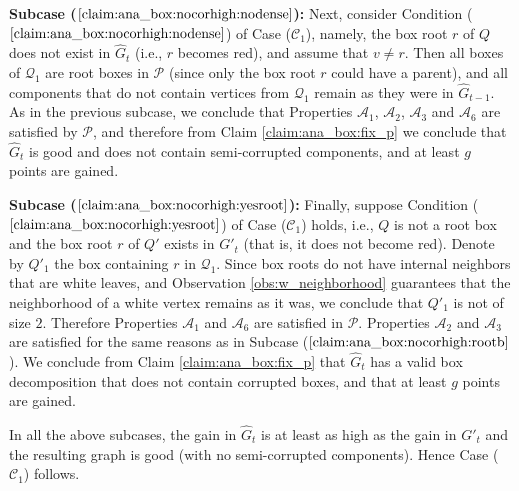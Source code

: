 \documentclass[11pt]{article}
\theoremstyle{definition}
\def\decomponereg{\mathcal{A}_1}
\def\decomponecorr{\mathcal{A}_2}
\def\decomproot{\mathcal{A}_3}
\def\decompedges{\mathcal{A}_6}
\def\boxpropnocorhigh{\mathcal{C}_1}
\begin{document}
\smallskip
\par\noindent
{\bf Subcase ($\ref{claim:ana_box:nocorhigh:nodense}$):}
	Next, consider Condition ($\ref{claim:ana_box:nocorhigh:nodense}$) of Case ($\boxpropnocorhigh$), namely,
	the box root $r$ of $Q$ does not exist in $\hat{G}_t$ (i.e., $r$ becomes red), and assume that $v \neq r$.
	Then all boxes of $\mathcal{Q}_1$ are root boxes in $\mathcal{P}$ (since only the box root $r$ could have a parent), and all components that do not contain vertices from $\mathcal{Q}_1$ remain as they were in $\hat{G}_{t-1}$.
	As in the previous subcase, 
	we conclude that Properties $\decomponereg$, $\decomponecorr$, $\decomproot$ and $\decompedges$ are satisfied by $\mathcal{P}$, and therefore from Claim
	\ref{claim:ana_box:fix_p} we conclude that $\hat{G}_t$ is good and does not contain semi-corrupted components, and at least $g$ points are gained.
	
\smallskip
\par\noindent
{\bf Subcase ($\ref{claim:ana_box:nocorhigh:yesroot}$):}
	Finally, suppose Condition ($\ref{claim:ana_box:nocorhigh:yesroot}$) of Case ($\boxpropnocorhigh$) holds, i.e.,
	$Q$ is not a root box and the box root $r$ of $Q'$ exists in $G'_t$ (that is, it does not become red). Denote by $Q'_1$ the box containing $r$ in $\mathcal{Q}_1$.
	Since box roots do not have internal neighbors that are white leaves, and Observation \ref{obs:w_neighborhood} guarantees that the neighborhood of a white vertex remains as it was, 
	we conclude that $Q'_1$ is not of size $2$.
	Therefore Properties $\decomponereg$ and $\decompedges$ are satisfied in $\mathcal{P}$. 
	Properties $\decomponecorr$ and $\decomproot$ are satisfied for the same reasons as in Subcase ($\ref{claim:ana_box:nocorhigh:rootb}$).
	We conclude from Claim \ref{claim:ana_box:fix_p} that $\hat{G}_t$ has a valid box decomposition that does not contain corrupted boxes, and that at least $g$ points are gained.

\smallskip
\par\noindent
In all the above subcases, the gain in $\hat{G}_t$ is at least as high as the gain in $G'_t$ and the resulting graph is good (with no semi-corrupted components).
Hence Case ($\boxpropnocorhigh$) follows.
\end{document}
